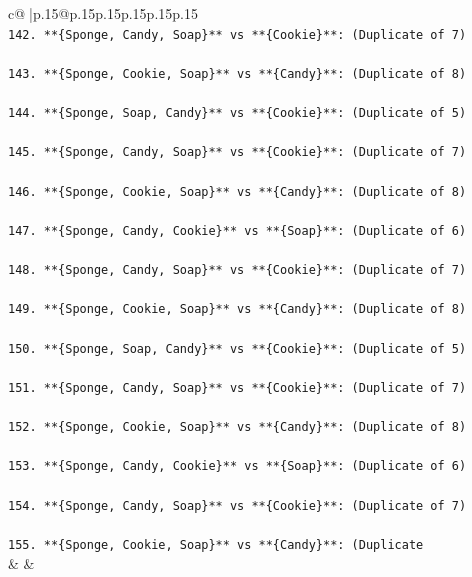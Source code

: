 \documentclass{article}
\begin{document}
{\begin{supertabular}{c@{$\;$}|p{.15\linewidth}@{}p{.15\linewidth}p{.15\linewidth}p{.15\linewidth}p{.15\linewidth}p{.15\linewidth}}
{{{\\ 
\texttt{142. **\{Sponge, Candy, Soap\}** vs **\{Cookie\}**: (Duplicate of 7)} \\
\\ 
\texttt{143. **\{Sponge, Cookie, Soap\}** vs **\{Candy\}**: (Duplicate of 8)} \\
\\ 
\texttt{144. **\{Sponge, Soap, Candy\}** vs **\{Cookie\}**: (Duplicate of 5)} \\
\\ 
\texttt{145. **\{Sponge, Candy, Soap\}** vs **\{Cookie\}**: (Duplicate of 7)} \\
\\ 
\texttt{146. **\{Sponge, Cookie, Soap\}** vs **\{Candy\}**: (Duplicate of 8)} \\
\\ 
\texttt{147. **\{Sponge, Candy, Cookie\}** vs **\{Soap\}**: (Duplicate of 6)} \\
\\ 
\texttt{148. **\{Sponge, Candy, Soap\}** vs **\{Cookie\}**: (Duplicate of 7)} \\
\\ 
\texttt{149. **\{Sponge, Cookie, Soap\}** vs **\{Candy\}**: (Duplicate of 8)} \\
\\ 
\texttt{150. **\{Sponge, Soap, Candy\}** vs **\{Cookie\}**: (Duplicate of 5)} \\
\\ 
\texttt{151. **\{Sponge, Candy, Soap\}** vs **\{Cookie\}**: (Duplicate of 7)} \\
\\ 
\texttt{152. **\{Sponge, Cookie, Soap\}** vs **\{Candy\}**: (Duplicate of 8)} \\
\\ 
\texttt{153. **\{Sponge, Candy, Cookie\}** vs **\{Soap\}**: (Duplicate of 6)} \\
\\ 
\texttt{154. **\{Sponge, Candy, Soap\}** vs **\{Cookie\}**: (Duplicate of 7)} \\
\\ 
\texttt{155. **\{Sponge, Cookie, Soap\}** vs **\{Candy\}**: (Duplicate} \\
            }
        }
    }
    & & \\ \\


\end{supertabular}}
\end{document}
